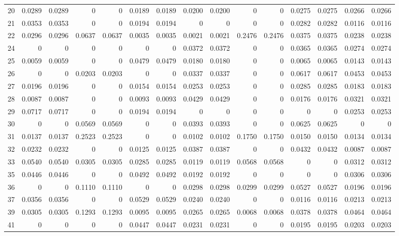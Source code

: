 \begin{table}[H]
\begin{tabular}{rrrrrrrrrrrrrrr}
20 & 0.0289 & 0.0289 & 0 & 0 & 0.0189 & 0.0189 & 0.0200 & 0.0200 & 0 & 0 & 0.0275 & 0.0275 & 0.0266 & 0.0266 \\
21 & 0.0353 & 0.0353 & 0 & 0 & 0.0194 & 0.0194 & 0 & 0 & 0 & 0 & 0.0282 & 0.0282 & 0.0116 & 0.0116 \\
22 & 0.0296 & 0.0296 & 0.0637 & 0.0637 & 0.0035 & 0.0035 & 0.0021 & 0.0021 & 0.2476 & 0.2476 & 0.0375 & 0.0375 & 0.0238 & 0.0238 \\
24 & 0 & 0 & 0 & 0 & 0 & 0 & 0.0372 & 0.0372 & 0 & 0 & 0.0365 & 0.0365 & 0.0274 & 0.0274 \\
25 & 0.0059 & 0.0059 & 0 & 0 & 0.0479 & 0.0479 & 0.0180 & 0.0180 & 0 & 0 & 0.0065 & 0.0065 & 0.0143 & 0.0143 \\
26 & 0 & 0 & 0.0203 & 0.0203 & 0 & 0 & 0.0337 & 0.0337 & 0 & 0 & 0.0617 & 0.0617 & 0.0453 & 0.0453 \\
27 & 0.0196 & 0.0196 & 0 & 0 & 0.0154 & 0.0154 & 0.0253 & 0.0253 & 0 & 0 & 0.0285 & 0.0285 & 0.0183 & 0.0183 \\
28 & 0.0087 & 0.0087 & 0 & 0 & 0.0093 & 0.0093 & 0.0429 & 0.0429 & 0 & 0 & 0.0176 & 0.0176 & 0.0321 & 0.0321 \\
29 & 0.0717 & 0.0717 & 0 & 0 & 0.0194 & 0.0194 & 0 & 0 & 0 & 0 & 0 & 0 & 0.0253 & 0.0253 \\
30 & 0 & 0 & 0.0569 & 0.0569 & 0 & 0 & 0.0393 & 0.0393 & 0 & 0 & 0.0625 & 0.0625 & 0 & 0 \\
31 & 0.0137 & 0.0137 & 0.2523 & 0.2523 & 0 & 0 & 0.0102 & 0.0102 & 0.1750 & 0.1750 & 0.0150 & 0.0150 & 0.0134 & 0.0134 \\
32 & 0.0232 & 0.0232 & 0 & 0 & 0.0125 & 0.0125 & 0.0387 & 0.0387 & 0 & 0 & 0.0432 & 0.0432 & 0.0087 & 0.0087 \\
33 & 0.0540 & 0.0540 & 0.0305 & 0.0305 & 0.0285 & 0.0285 & 0.0119 & 0.0119 & 0.0568 & 0.0568 & 0 & 0 & 0.0312 & 0.0312 \\
35 & 0.0446 & 0.0446 & 0 & 0 & 0.0492 & 0.0492 & 0.0192 & 0.0192 & 0 & 0 & 0 & 0 & 0.0306 & 0.0306 \\
36 & 0 & 0 & 0.1110 & 0.1110 & 0 & 0 & 0.0298 & 0.0298 & 0.0299 & 0.0299 & 0.0527 & 0.0527 & 0.0196 & 0.0196 \\
37 & 0.0356 & 0.0356 & 0 & 0 & 0.0529 & 0.0529 & 0.0240 & 0.0240 & 0 & 0 & 0.0116 & 0.0116 & 0.0213 & 0.0213 \\
39 & 0.0305 & 0.0305 & 0.1293 & 0.1293 & 0.0095 & 0.0095 & 0.0265 & 0.0265 & 0.0068 & 0.0068 & 0.0378 & 0.0378 & 0.0464 & 0.0464 \\
41 & 0 & 0 & 0 & 0 & 0.0447 & 0.0447 & 0.0231 & 0.0231 & 0 & 0 & 0.0195 & 0.0195 & 0.0203 & 0.0203 \\

\end{tabular}
\end{table}
